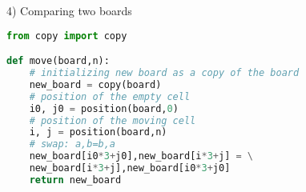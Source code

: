 4) Comparing two boards

\begin{lstlisting}[language=Python,style=codelst2,caption={Python: 8-puzzle, maing a move, returning new board}]
from copy import copy

def move(board,n):
    # initializing new board as a copy of the board
    new_board = copy(board)
    # position of the empty cell
    i0, j0 = position(board,0)
    # position of the moving cell
    i, j = position(board,n)
    # swap: a,b=b,a
    new_board[i0*3+j0],new_board[i*3+j] = \
    new_board[i*3+j],new_board[i0*3+j0]
    return new_board
\end{lstlisting}




